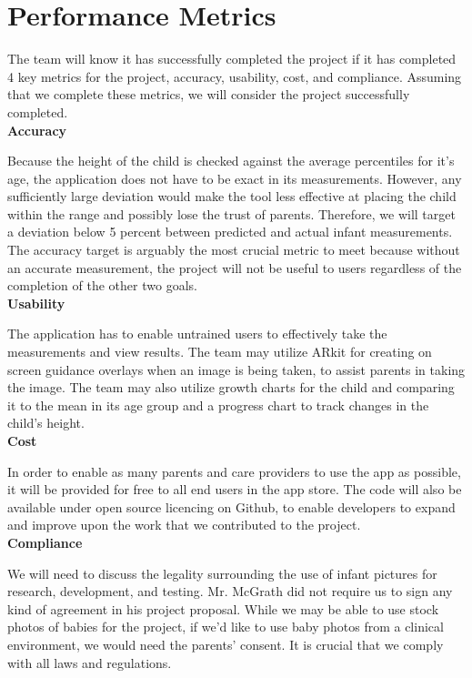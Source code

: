 \documentclass[10pt, draftclsnofoot, letterpaper, margin=.75in, onecolumn]{IEEEtran}
\begin{document}
\section{Performance Metrics}
\par \noindent The team will know it has successfully completed the project if it has completed 4 key metrics for the project, accuracy, usability, cost, and compliance. Assuming that we complete these metrics, we will consider the project successfully completed.\\

\textbf{Accuracy}
\par \noindent Because the height of the child is checked against the average percentiles for it’s age, the application does not have to be exact in its measurements. However, any sufficiently large deviation would make the tool less effective at placing the child within the range and possibly lose the trust of parents. Therefore, we will target a deviation below 5 percent between predicted and actual infant measurements. The accuracy target is arguably the most crucial metric to meet because without an accurate measurement, the project will not be useful to users regardless of the completion of the other two goals.\\

\textbf{Usability}
\par \noindent The application has to enable untrained users to effectively take the measurements and view results. The team may utilize ARkit for creating on screen guidance overlays when an image is being taken, to assist parents in taking the image. The team may also utilize growth charts for the child and comparing it to the mean in its age group and a progress chart to track changes in the child's height.\\

\textbf{Cost}
\par \noindent In order to enable as many parents and care providers to use the app as possible, it will be provided for free to all end users in the app store.  The code will also be available under open source licencing on Github, to enable developers to expand and improve upon the work that we contributed to the project.\\

\textbf{Compliance}
\par \noindent We will need to discuss the legality surrounding the use of infant pictures for research, development, and testing. Mr. McGrath did not require us to sign any kind of agreement in his project proposal. While we may be able to use stock photos of babies for the project, if we’d like to use baby photos from a clinical environment, we would need the parents’ consent. It is crucial that we comply with all laws and regulations.\\
\end{document}
